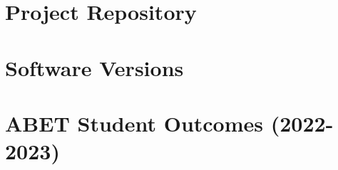 \documentclass[12pt]{report}
\begin{document}
    \clearpage
    \appendix
    \chapter{Project Repository}
    \label{appendix:appendix_github}
    

    \clearpage
    \chapter{Software Versions}
    \label{appendix:appendix_versions}
    

    \chapter{ABET Student Outcomes (2022-2023)}
    \label{appendix:appendix_abet}
    
\end{document}
